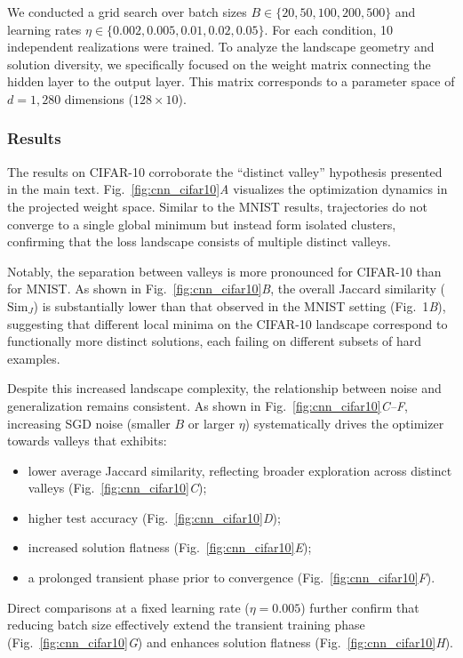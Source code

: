 \documentclass[aps,prx,preprint,superscriptaddress,nofootinbib]{revtex4-2}
\begin{document}
We conducted a grid search over batch sizes $B \in \{20, 50, 100, 200, 500\}$ and learning rates $\eta \in \{0.002, 0.005, 0.01, 0.02, 0.05\}$. For each condition, 10 independent realizations were trained. To analyze the landscape geometry and solution diversity, we specifically focused on the weight matrix connecting the hidden layer to the output layer. This matrix corresponds to a parameter space of $d=1,280$ dimensions ($128 \times 10$).

\subsubsection{Results}
The results on CIFAR-10 corroborate the ``distinct valley'' hypothesis presented in the main text. Fig.~\ref{fig:cnn_cifar10}\textit{A} visualizes the optimization dynamics in the projected weight space. Similar to the MNIST results, trajectories do not converge to a single global minimum but instead form isolated clusters, confirming that the loss landscape consists of multiple distinct valleys.

Notably, the separation between valleys is more pronounced for CIFAR-10 than for MNIST. As shown in Fig.~\ref{fig:cnn_cifar10}\textit{B}, the overall Jaccard similarity ($\mathrm{Sim}_J$) is substantially lower than that observed in the MNIST setting (Fig.~1\textit{B}), suggesting that different local minima on the CIFAR-10 landscape correspond to functionally more distinct solutions, each failing on different subsets of hard examples.

Despite this increased landscape complexity, the relationship between noise and generalization remains consistent. As shown in Fig.~\ref{fig:cnn_cifar10}\textit{C--F}, increasing SGD noise (smaller $B$ or larger $\eta$) systematically drives the optimizer towards valleys that exhibits:
\begin{itemize}
    \item lower average Jaccard similarity, reflecting broader exploration across distinct valleys (Fig.~\ref{fig:cnn_cifar10}\textit{C});
    \item higher test accuracy (Fig.~\ref{fig:cnn_cifar10}\textit{D});
    \item increased solution flatness (Fig.~\ref{fig:cnn_cifar10}\textit{E});
    \item a prolonged transient phase prior to convergence (Fig.~\ref{fig:cnn_cifar10}\textit{F}).
\end{itemize}
Direct comparisons at a fixed learning rate ($\eta=0.005$) further confirm that reducing batch size effectively extend the transient training phase (Fig.~\ref{fig:cnn_cifar10}\textit{G}) and enhances solution flatness (Fig.~\ref{fig:cnn_cifar10}\textit{H}).
\end{document}
